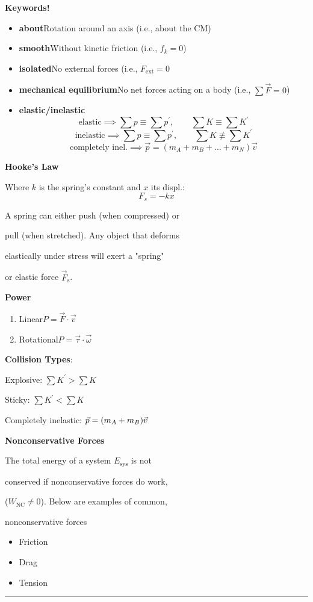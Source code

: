 \documentclass[	DIV=calc,%
							paper=a4,%
							fontsize=11pt,%
							twocolumn]{scrartcl} %
\newcommand{\hformbar}[1]{\vspace{5pt}\hrule\vspace{10pt}} %
\newcommand{\pvec}[1]{\vec{#1}\mkern2mu\vphantom{#1}}
\begin{document}
\textbf{Keywords!}
\begin{itemize}
    \item \textbf{about}\newline\qquad Rotation around an axis (i.e., about the CM)
    \item \textbf{smooth}\newline\qquad Without kinetic friction (i.e., $f_k=0$)
    \item \textbf{isolated}\newline\qquad No external forces (i.e., $F_\text{ext}=0$
    \item \textbf{mechanical equilibrium}\newline\qquad No net forces acting on a body (i.e., $\sum\vec F=0$)
    \item \textbf{elastic/inelastic}\newline\qquad $$\text{elastic}\implies\sum p\equiv\sum p^\prime,\qquad\sum K\equiv\sum K^\prime$$
    $$\text{inelastic}\implies\sum p\equiv\sum p^\prime,\qquad\sum K\not\equiv\sum K^\prime$$
    $$\text{completely inel.}\implies\vec p=(m_A+m_B+...+m_N)\vec v$$
\end{itemize}

\textbf{Hooke's Law}

Where $k$ is the spring's constant and $x$ its displ.:
\begin{equation}
    F_s = -kx
\end{equation}

A spring can either push (when compressed) or 

pull (when stretched). Any object that deforms 

elastically under stress will exert a "spring" 

or elastic force $\vec F_\text{s}$. 

\textbf{Power}
\begin{enumerate}
    \item Linear\qquad\qquad$P=\vec F\cdot\vec v$
    \item Rotational\qquad$P=\vec\tau\cdot\vec\omega$
\end{enumerate}

\textbf{Collision Types}:

\qquad Explosive: $\sum K^\prime > \sum K$

\qquad Sticky: $\sum K^\prime < \sum K$

\qquad Completely inelastic: $\vec p = (m_A+m_B)\pvec{v}$

\textbf{Nonconservative Forces}

The total energy of a system $E_\text{sys}$ is not 

conserved if nonconservative forces do work, 

($W_{\text{NC}}\ne 0$). Below are examples of common, 

nonconservative forces
\begin{itemize}
    \item Friction
    \item Drag
    \item Tension
\end{itemize}
        
    \hformbar{}
    
\end{document}
